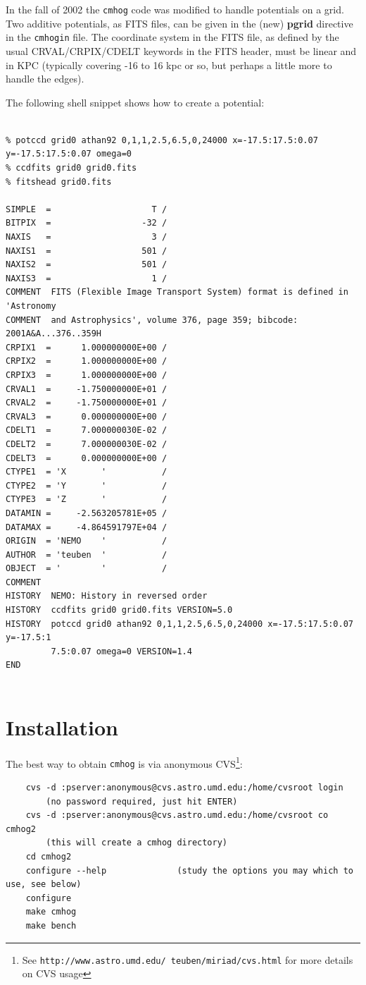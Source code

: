 \documentclass[10pt,dvips]{article}
\begin{document}
In the fall of 2002 the {\tt cmhog} code was modified to handle potentials
on a grid. Two additive potentials, as FITS files, can be given in the
(new) {\bf pgrid} directive in the {\tt cmhogin} file. The coordinate
system in the FITS file, as defined by the usual CRVAL/CRPIX/CDELT keywords
in the FITS header, must be linear and in KPC (typically covering -16 to
16 kpc or so, but perhaps a little more to handle the edges). 

The following shell snippet shows how to create a potential:


\begin{verbatim}

% potccd grid0 athan92 0,1,1,2.5,6.5,0,24000 x=-17.5:17.5:0.07 y=-17.5:17.5:0.07 omega=0
% ccdfits grid0 grid0.fits 
% fitshead grid0.fits

SIMPLE  =                    T /
BITPIX  =                  -32 /
NAXIS   =                    3 /
NAXIS1  =                  501 /
NAXIS2  =                  501 /
NAXIS3  =                    1 /
COMMENT  FITS (Flexible Image Transport System) format is defined in 'Astronomy
COMMENT  and Astrophysics', volume 376, page 359; bibcode: 2001A&A...376..359H
CRPIX1  =      1.000000000E+00 /
CRPIX2  =      1.000000000E+00 /
CRPIX3  =      1.000000000E+00 /
CRVAL1  =     -1.750000000E+01 /
CRVAL2  =     -1.750000000E+01 /
CRVAL3  =      0.000000000E+00 /
CDELT1  =      7.000000030E-02 /
CDELT2  =      7.000000030E-02 /
CDELT3  =      0.000000000E+00 /
CTYPE1  = 'X       '           /
CTYPE2  = 'Y       '           /
CTYPE3  = 'Z       '           /
DATAMIN =     -2.563205781E+05 /
DATAMAX =     -4.864591797E+04 /
ORIGIN  = 'NEMO    '           /
AUTHOR  = 'teuben  '           /
OBJECT  = '        '           /
COMMENT
HISTORY  NEMO: History in reversed order
HISTORY  ccdfits grid0 grid0.fits VERSION=5.0
HISTORY  potccd grid0 athan92 0,1,1,2.5,6.5,0,24000 x=-17.5:17.5:0.07 y=-17.5:1
         7.5:0.07 omega=0 VERSION=1.4
END


\end{verbatim}



\section{Installation}

The best way to obtain {\tt cmhog} is via 
anonymous CVS\footnote{See {\tt http://www.astro.umd.edu/~teuben/miriad/cvs.html}
for more details on CVS usage}: 

\begin{verbatim}
	cvs -d :pserver:anonymous@cvs.astro.umd.edu:/home/cvsroot login
		(no password required, just hit ENTER)
	cvs -d :pserver:anonymous@cvs.astro.umd.edu:/home/cvsroot co cmhog2
		(this will create a cmhog directory)
	cd cmhog2
	configure --help              (study the options you may which to use, see below)
	configure
	make cmhog
	make bench

\end{verbatim}
\end{document}
